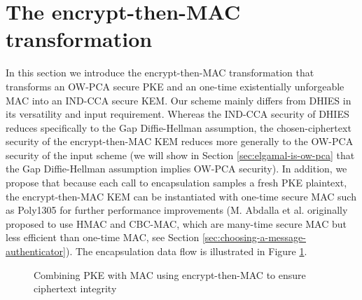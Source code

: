 \documentclass[journal=tches,submission]{iacrtrans}
\newcommand{\mac}{\texttt{MAC}}
\newcommand{\pk}{\texttt{pk}}
\newcommand{\leftsample}{\stackrel{\$}{\leftarrow}}
\begin{document}
\section{The encrypt-then-MAC transformation}\label{sec:main-results}
In this section we introduce the encrypt-then-MAC transformation that transforms an OW-PCA secure PKE and an one-time existentially unforgeable MAC into an IND-CCA secure KEM. Our scheme mainly differs from DHIES in its versatility and input requirement. Whereas the IND-CCA security of DHIES reduces specifically to the Gap Diffie-Hellman assumption, the chosen-ciphertext security of the encrypt-then-MAC KEM reduces more generally to the OW-PCA security \cite{DBLP:conf/ctrsa/OkamotoP01} of the input scheme (we will show in Section \ref{sec:elgamal-is-ow-pca} that the Gap Diffie-Hellman assumption implies OW-PCA security). In addition, we propose that because each call to encapsulation samples a fresh PKE plaintext, the encrypt-then-MAC KEM can be instantiated with one-time secure MAC such as Poly1305 for further performance improvements (M. Abdalla et al. originally proposed to use HMAC and CBC-MAC, which are many-time secure MAC but less efficient than one-time MAC, see Section \ref{sec:choosing-a-message-authenticator}). The encapsulation data flow is illustrated in Figure \ref{fig:etm-diagram}.

\begin{figure}[h]
    \centering

    \caption{Combining PKE with MAC using encrypt-then-MAC to ensure ciphertext integrity}\label{fig:etm-diagram}
\end{figure}
\end{document}
